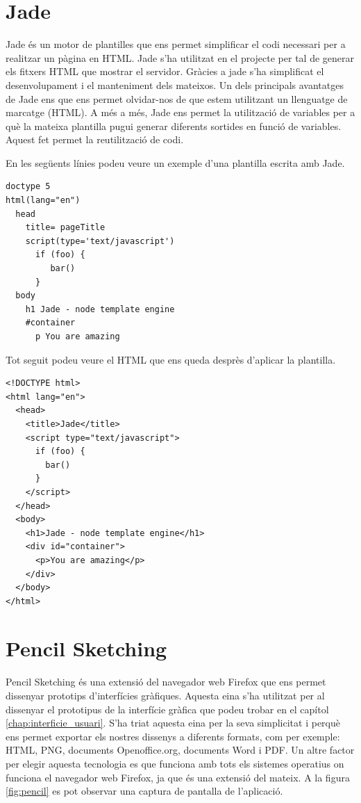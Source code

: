 \section{Jade}

Jade és un motor de plantilles que ens permet simplificar el codi necessari per a realitzar un pàgina en HTML. Jade s'ha utilitzat en el projecte per tal de generar els fitxers HTML que mostrar el servidor. Gràcies a jade s'ha simplificat el desenvolupament i el manteniment dels mateixos. Un dels principals avantatges de Jade ens que ens permet olvidar-nos de que estem utilitzant un llenguatge de marcatge (HTML). A més a més, Jade ens permet la utilització de variables per a què la mateixa plantilla pugui generar diferents sortides en funció de variables. Aquest fet permet la reutilització de codi.

En les següents línies podeu veure un exemple d'una plantilla escrita amb Jade. 

\begin{lstlisting}
doctype 5
html(lang="en")
  head
    title= pageTitle
    script(type='text/javascript')
      if (foo) {
         bar()
      }
  body
    h1 Jade - node template engine
    #container
      p You are amazing
\end{lstlisting}

Tot seguit podeu veure el HTML que ens queda desprès d'aplicar la plantilla. 

\begin{lstlisting}
<!DOCTYPE html>
<html lang="en">
  <head>
    <title>Jade</title>
    <script type="text/javascript">
      if (foo) {
      	bar()
      }
    </script>
  </head>
  <body>
    <h1>Jade - node template engine</h1>
    <div id="container">
      <p>You are amazing</p>
    </div>
  </body>
</html>	
\end{lstlisting}

\section{Pencil Sketching}
\label{sec:pencil sketcing}
Pencil Sketching és una extensió del navegador web Firefox que ens permet dissenyar prototips d'interfícies gràfiques. Aquesta eina s'ha utilitzat per al dissenyar el prototipus de la interfície gràfica que podeu trobar en el capítol \ref{chap:interficie_usuari}. S'ha triat aquesta eina per la seva simplicitat i perquè ens permet exportar els nostres dissenys a diferents formats, com per exemple: HTML, PNG, documents Openoffice.org, documents Word i PDF. Un altre factor per elegir aquesta tecnologia es que funciona amb tots els sistemes operatius on funciona el navegador web Firefox, ja que és una extensió del mateix. A la figura \ref{fig:pencil} es pot observar una captura de pantalla de l'aplicació. 

